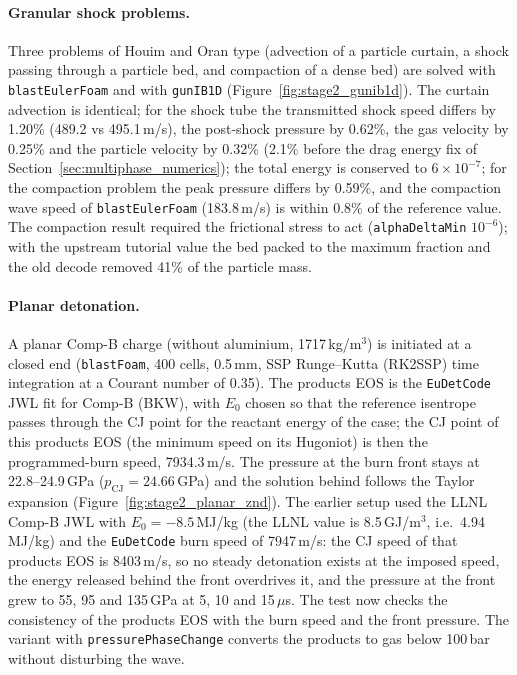 \documentclass{article}
\begin{document}
\paragraph{Granular shock problems.} Three problems of Houim and Oran type (advection of a particle curtain, a shock passing through a particle bed, and compaction of a dense bed) are solved with \texttt{blastEulerFoam} and with \texttt{gunIB1D} (Figure~\ref{fig:stage2_gunib1d}). The curtain advection is identical; for the shock tube the transmitted shock speed differs by 1.20\% (489.2 vs 495.1\,m/s), the post-shock pressure by 0.62\%, the gas velocity by 0.25\% and the particle velocity by 0.32\% (2.1\% before the drag energy fix of Section~\ref{sec:multiphase_numerics}); the total energy is conserved to $6\times10^{-7}$; for the compaction problem the peak pressure differs by 0.59\%, and the compaction wave speed of \texttt{blastEulerFoam} (183.8\,m/s) is within 0.8\% of the reference value. The compaction result required the frictional stress to act (\texttt{alphaDeltaMin} $10^{-6}$); with the upstream tutorial value the bed packed to the maximum fraction and the old decode removed 41\% of the particle mass.

\paragraph{Planar detonation.} A planar Comp-B charge (without aluminium, 1717\,kg/m$^3$) is initiated at a closed end (\texttt{blastFoam}, 400 cells, 0.5\,mm, SSP Runge--Kutta (RK2SSP) time integration at a Courant number of 0.35). The products EOS is the \texttt{EuDetCode} JWL fit for Comp-B (BKW), with $E_0$ chosen so that the reference isentrope passes through the CJ point for the reactant energy of the case; the CJ point of this products EOS (the minimum speed on its Hugoniot) is then the programmed-burn speed, 7934.3\,m/s. The pressure at the burn front stays at 22.8--24.9\,GPa ($p_\text{CJ} = 24.66$\,GPa) and the solution behind follows the Taylor expansion (Figure~\ref{fig:stage2_planar_znd}). The earlier setup used the LLNL Comp-B JWL with $E_0 = -8.5$\,MJ/kg (the LLNL value is 8.5\,GJ/m$^3$, i.e.\ 4.94\,MJ/kg) and the \texttt{EuDetCode} burn speed of 7947\,m/s: the CJ speed of that products EOS is 8403\,m/s, so no steady detonation exists at the imposed speed, the energy released behind the front overdrives it, and the pressure at the front grew to 55, 95 and 135\,GPa at 5, 10 and 15\,$\mu$s. The test now checks the consistency of the products EOS with the burn speed and the front pressure. The variant with \texttt{pressurePhaseChange} converts the products to gas below 100\,bar without disturbing the wave.
\end{document}

